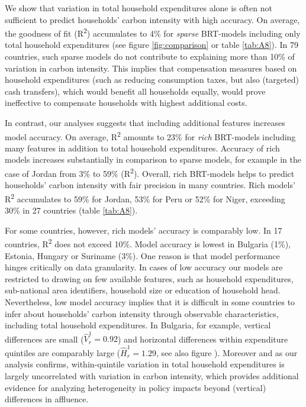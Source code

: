 \documentclass[12pt, a4paper]{article}
\begin{document}
We show that variation in total household expenditures alone is often not sufficient to predict households' carbon intensity with high accuracy. On average, the goodness of fit (R\textsuperscript{2}) accumulates to 4\% for \textit{sparse} BRT-models including only total household expenditures (see figure \ref{fig:comparison} or table \ref{tab:A8}). In 79 countries, such sparse models do not contribute to explaining more than 10\% of variation in carbon intensity. This implies that compensation measures based on household expenditures (such as reducing consumption taxes, but also (targeted) cash transfers), which would benefit all households equally, would prove ineffective to compensate households with highest additional costs.

In contrast, our analyses suggests that including additional features increases model accuracy. On average, R\textsuperscript{2} amounts to 23\% for \textit{rich} BRT-models including many features in addition to total household expenditures. Accuracy of rich models increases substantially in comparison to sparse models, for example in the case of Jordan from 3\% to 59\% (R\textsuperscript{2}). Overall, rich BRT-models helps to predict households' carbon intensity with fair precision in many countries. Rich models' R\textsuperscript{2} accumulates to 59\% for Jordan, 53\% for Peru or 52\% for Niger, exceeding 30\% in 27 countries (table \ref{tab:A8}).

For some countries, however, rich models' accuracy is comparably low. In 17 countries, R\textsuperscript{2} does not exceed 10\%. Model accuracy is lowest in Bulgaria (1\%), Estonia, Hungary or Suriname (3\%). One reason is that model performance hinges critically on data granularity. In cases of low accuracy our models are restricted to drawing on few available features, such as household expenditures, sub-national area identifiers, household size or education of household head. Nevertheless, low model accuracy implies that it is difficult in some countries to infer about households' carbon intensity through observable characteristics, including total household expenditures. In Bulgaria, for example, vertical differences are small ($\widehat{V}_{r}^{1}=0.92$) and horizontal differences within expenditure quintiles are comparably large ($\widehat{H}_{r}^{1}=1.29$, see also figure ). Moreover and as our analysis confirms, within-quintile variation in total household expenditures is largely uncorrelated with variation in carbon intensity, which provides additional evidence for analyzing heterogeneity in policy impacts beyond (vertical) differences in affluence.
\end{document}
